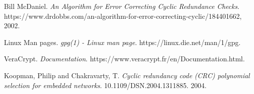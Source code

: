 \documentclass[11pt]{utalcaDoc}
\begin{document}
\begin{thebibliography}{9}
	Bill McDaniel.
	\textit{An Algorithm for Error Correcting Cyclic Redundance Checks}.
	https://www.drdobbs.com/an-algorithm-for-error-correcting-cyclic/184401662, 2002.

	Linux Man pages.
	\textit{gpg(1) - Linux man page}.
	https://linux.die.net/man/1/gpg.


	VeraCrypt.
	\textit{Documentation}.
	https://www.veracrypt.fr/en/Documentation.html.


	Koopman, Philip and Chakravarty, T.
	\textit{Cyclic redundancy code (CRC) polynomial selection for embedded networks}.
	10.1109/DSN.2004.1311885. 2004.


\end{thebibliography}
\end{document}
